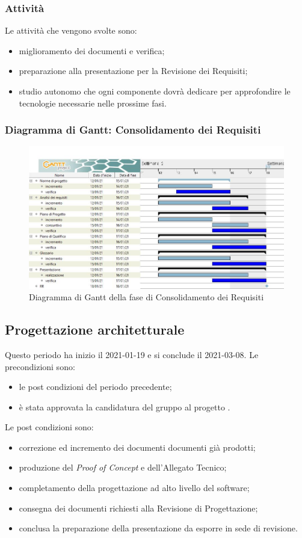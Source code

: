 \subsubsection{Attività}
Le attività che vengono svolte sono:
\begin{itemize}
	\item miglioramento dei documenti e verifica;
	\item preparazione alla presentazione per la Revisione dei Requisiti;
	\item studio autonomo che ogni componente dovrà dedicare per approfondire le tecnologie necessarie nelle prossime fasi.
\end{itemize}
\subsubsection{Diagramma di Gantt: Consolidamento dei Requisiti}
\begin{figure}[H]
    \centering
    \includegraphics[scale = 0.4]{components/img/consolidamento_requisiti.jpg}
    \caption{Diagramma di Gantt della fase di Consolidamento dei Requisiti}
    \label{fig:Diagramma di Gantt, fase di Consolidamento dei Requisiti}
\end{figure}

\newpage
\subsection{Progettazione architetturale}
Questo periodo ha inizio il 2021-01-19 e si conclude il 2021-03-08.
Le precondizioni sono:
\begin{itemize}
	\item le post condizioni del periodo precedente;
	\item è stata approvata la candidatura del gruppo al progetto \NomeProgetto.
\end{itemize}
Le post condizioni sono:
\begin{itemize}
	\item correzione ed incremento dei documenti documenti già prodotti;
	\item produzione del \textit{Proof of Concept} e dell'Allegato Tecnico;
	\item completamento della progettazione ad alto livello del software;
	\item consegna dei documenti richiesti alla Revisione di Progettazione; 	
	\item conclusa la preparazione della presentazione da esporre in sede di revisione.
\end{itemize}

